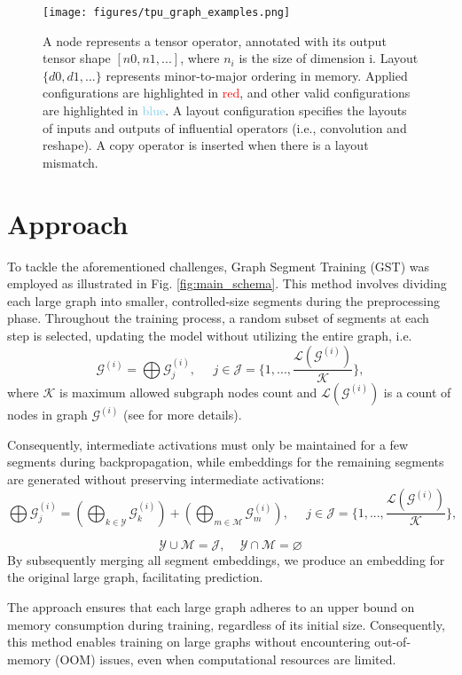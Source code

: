 \documentclass{article}
\begin{document}
\begin{figure}
\label{fig:tpu_graph}
    \centering
    \texttt{[image: figures/tpu\_graph\_examples.png]}
    \caption{A node represents a tensor operator, annotated with its output tensor shape $[n0, n1, ...]$,
where $n_i$
is the size of dimension i. Layout $\{d0, d1, ...\}$ represents minor-to-major ordering in
memory. Applied configurations are highlighted in \textcolor{red}{red}, and other valid configurations are highlighted
in \textcolor{SkyBlue}{blue}. A layout configuration specifies the layouts of inputs and outputs of influential operators (i.e.,
convolution and reshape). A copy operator is inserted when there is a layout mismatch.}
\end{figure}

\section{Approach}
\label{sec:approach}

To tackle the aforementioned challenges, Graph Segment Training (GST) was employed as illustrated in Fig. \ref{fig:main_schema}. This method involves dividing each large graph into smaller, controlled-size segments during the preprocessing phase. Throughout the training process, a random subset of segments at each step is selected, updating the model without utilizing the entire graph, i.e. $$\mathcal{G}^{(i)} = \bigoplus \mathcal{G}^{(i)}_{j}, \; \; \; \; \; j \in \mathcal{J} = \{1, ... , \frac{\mathcal{L}(\mathcal{G}^{(i)})}{\mathcal{K}}\},$$ where $\mathcal{K}$ is maximum allowed subgraph nodes count and $\mathcal{L}(\mathcal{G}^{(i)})$ is a count of nodes in graph $\mathcal{G}^{(i)}$ (see \cite{cao2023learning} for more details). 

Consequently, intermediate activations must only be maintained for a few segments during backpropagation, while embeddings for the remaining segments are generated without preserving intermediate activations:
$$\bigoplus \mathcal{G}^{(i)}_{j} = (\bigoplus_{k \in \mathcal{Y}} \mathcal{G}^{(i)}_{k}) + (\bigoplus_{m \in \mathcal{M}} \mathcal{G}^{(i)}_{m}), \; \; \; \; \;j \in \mathcal{J} = \{1, ... , \frac{\mathcal{L}(\mathcal{G}^{(i)})}{\mathcal{K}}\}, $$

$$\mathcal{Y} \cup \mathcal{M} = \mathcal{J}, \:\:\:\;\: \mathcal{Y}  \cap \mathcal{M} = \varnothing $$
By subsequently merging all segment embeddings, we produce an embedding for the original large graph, facilitating prediction.

The approach ensures that each large graph adheres to an upper bound on memory consumption during training, regardless of its initial size. Consequently, this method enables training on large graphs without encountering out-of-memory (OOM) issues, even when computational resources are limited.
\end{document}

